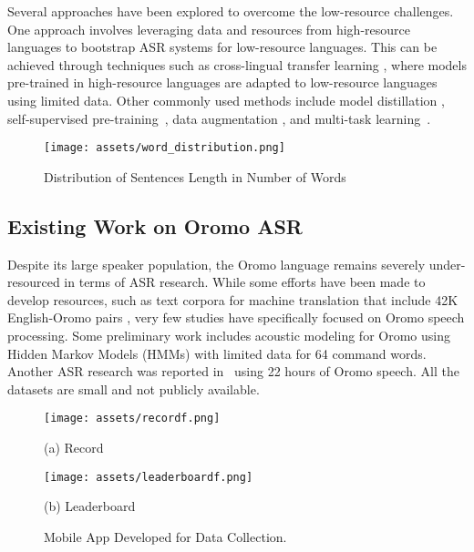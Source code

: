 \documentclass[conference, 9pt]{IEEEtran}
\begin{document}
Several approaches have been explored to overcome the low-resource challenges. One approach involves leveraging data and resources from high-resource languages to bootstrap ASR systems for low-resource languages. This can be achieved through techniques such as cross-lingual transfer learning \cite{yadav-sitaram-2022-survey}, where models pre-trained in high-resource languages are adapted to low-resource languages using limited data. Other commonly used methods include model distillation \cite{seth2023, yang2023knowledge}, self-supervised pre-training~\cite{baevski2019effectiveness}, data augmentation \cite{Park_2019, nguyen2020improvingseq2seqasr, Lam_2021}, and multi-task learning~\cite{chen2014joint}.
\begin{figure}[htb]
    \centering
    \texttt{[image: assets/word\_distribution.png]}
    \caption{Distribution of Sentences Length in Number of Words}
    \label{fig:wordd}
\end{figure}
\subsection{Existing Work on Oromo ASR}

Despite its large speaker population, the Oromo language remains severely under-resourced in terms of ASR research. While some efforts have been made to develop resources, such as text corpora for machine translation that include 42K English-Oromo pairs \cite{chala2021}, very few studies have specifically focused on Oromo speech processing. Some preliminary work includes acoustic modeling for Oromo using Hidden Markov Models (HMMs) with limited data \cite{teshite2023afan} for 64 command words. Another ASR research was reported in~\cite{abate-etal-2020-large} using 22 hours of Oromo speech. All the datasets are small and not publicly available. 

\begin{figure}[htb]
\begin{minipage}[b]{.5\linewidth}
  \centering
  \centerline{\texttt{[image: assets/recordf.png]}}
  \centerline{(a) Record}\medskip
\end{minipage}
\hfill
\begin{minipage}[b]{0.48\linewidth}
  \centering
  \centerline{\texttt{[image: assets/leaderboardf.png]}}
  \centerline{(b) Leaderboard }\medskip
\end{minipage}
%
\caption{Mobile App Developed for Data Collection.}
\label{fig:app}
%
\end{figure}
\end{document}
